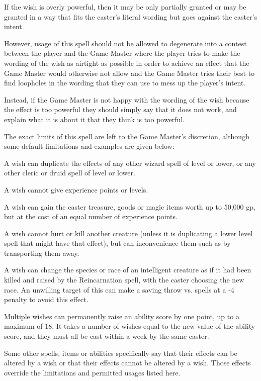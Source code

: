 \begin{multicols*}{2}
If the wish is overly powerful, then it may be only partially granted or may be granted in a way that fits the caster’s literal wording but goes against the caster’s intent.

However, usage of this spell should not be allowed to degenerate into a contest between the player and the Game Master where the player tries to make the wording of the wish as airtight as possible in order to achieve an effect that the Game Master would otherwise not allow and the Game Master tries their best to find loopholes in the wording that they can use to mess up the player’s intent.

Instead, if the Game Master is not happy with the wording of the wish because the effect is too powerful they should simply say that it does not work, and explain what it is about it that they think is too powerful.

The exact limits of this spell are left to the Game Master’s discretion, although some default limitations and examples are given below:

A wish can duplicate the effects of any other wizard spell of  level or lower, or any other cleric or druid spell of  level or lower.

A wish cannot give experience points or levels.

A wish can gain the caster treasure, goods or magic items worth up to 50,000 gp, but at the cost of an equal number of experience points.

A wish cannot hurt or kill another creature (unless it is duplicating a lower level spell that might have that effect), but can inconvenience them such as by transporting them away.

A wish can change the species or race of an intelligent creature as if it had been killed and raised by the Reincarnation spell, with the caster choosing the new race. An unwilling target of this can make a saving throw vs. spells at a -4 penalty to avoid this effect.

Multiple wishes can permanently raise an ability score by one point, up to a maximum of 18. It takes a number of wishes equal to the new value of the ability score, and they must all be cast within a week by the same caster.

Some other spells, items or abilities specifically say that their effects can be altered by a wish or that their effects cannot be altered by a wish. Those effects override the limitations and permitted usages listed here.


\end{multicols*}
